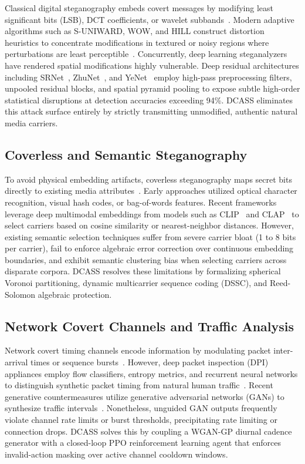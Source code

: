 \documentclass[conference]{IEEEtran}
\begin{document}
Classical digital steganography embeds covert messages by modifying least significant bits (LSB), DCT coefficients, or wavelet subbands~\cite{provos2003hide}. Modern adaptive algorithms such as S-UNIWARD, WOW, and HILL construct distortion heuristics to concentrate modifications in textured or noisy regions where perturbations are least perceptible~\cite{holub2014universal,holub2012designing,li2014new}. Concurrently, deep learning steganalyzers have rendered spatial modifications highly vulnerable. Deep residual architectures including SRNet~\cite{boroumand2018deep}, ZhuNet~\cite{zhang2019run}, and YeNet~\cite{ye2017deep} employ high-pass preprocessing filters, unpooled residual blocks, and spatial pyramid pooling to expose subtle high-order statistical disruptions at detection accuracies exceeding 94\%. DCASS eliminates this attack surface entirely by strictly transmitting unmodified, authentic natural media carriers.

\subsection{Coverless and Semantic Steganography}

To avoid physical embedding artifacts, coverless steganography maps secret bits directly to existing media attributes~\cite{zhou2015novel,zhang2018coverless}. Early approaches utilized optical character recognition, visual hash codes, or bag-of-words features. Recent frameworks leverage deep multimodal embeddings from models such as CLIP~\cite{radford2021learning} and CLAP~\cite{elizalde2023clap} to select carriers based on cosine similarity or nearest-neighbor distances. However, existing semantic selection techniques suffer from severe carrier bloat (1 to 8 bits per carrier), fail to enforce algebraic error correction over continuous embedding boundaries, and exhibit semantic clustering bias when selecting carriers across disparate corpora. DCASS resolves these limitations by formalizing spherical Voronoi partitioning, dynamic multicarrier sequence coding (DSSC), and Reed-Solomon algebraic protection.

\subsection{Network Covert Channels and Traffic Analysis}

Network covert timing channels encode information by modulating packet inter-arrival times or sequence bursts~\cite{cabuk2004ip,wright2006inferring}. However, deep packet inspection (DPI) appliances employ flow classifiers, entropy metrics, and recurrent neural networks to distinguish synthetic packet timing from natural human traffic~\cite{dyer2012peekaboo,wang2014seeing}. Recent generative countermeasures utilize generative adversarial networks (GANs) to synthesize traffic intervals~\cite{goodfellow2014generative}. Nonetheless, unguided GAN outputs frequently violate channel rate limits or burst thresholds, precipitating rate limiting or connection drops. DCASS solves this by coupling a WGAN-GP diurnal cadence generator with a closed-loop PPO reinforcement learning agent that enforces invalid-action masking over active channel cooldown windows.
\end{document}
